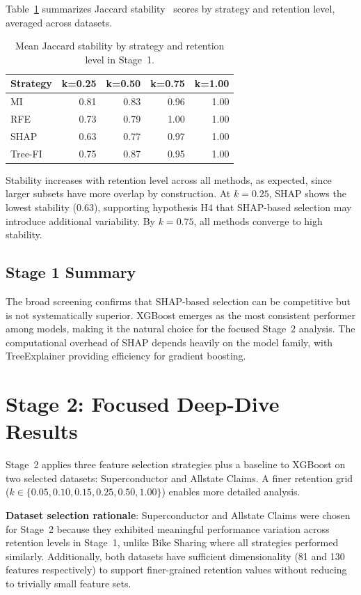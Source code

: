 Table~\ref{tab:stage1_stability} summarizes Jaccard stability~\cite{Nogueira2018Stability} scores by strategy and retention level, averaged across datasets.

\begin{table}[ht!]
\centering
\caption{Mean Jaccard stability by strategy and retention level in Stage~1.}
\label{tab:stage1_stability}
\begin{tabular}{lrrrr}
\toprule
\textbf{Strategy} & \textbf{k=0.25} & \textbf{k=0.50} & \textbf{k=0.75} & \textbf{k=1.00} \\
\midrule
MI & 0.81 & 0.83 & 0.96 & 1.00 \\
RFE & 0.73 & 0.79 & 1.00 & 1.00 \\
SHAP & 0.63 & 0.77 & 0.97 & 1.00 \\
Tree-FI & 0.75 & 0.87 & 0.95 & 1.00 \\
\bottomrule
\end{tabular}
\end{table}

Stability increases with retention level across all methods, as expected, since larger subsets have more overlap by construction. At $k=0.25$, SHAP shows the lowest stability (0.63), supporting hypothesis H4 that SHAP-based selection may introduce additional variability. By $k=0.75$, all methods converge to high stability.

\subsection{Stage 1 Summary}

The broad screening confirms that SHAP-based selection can be competitive but is not systematically superior. XGBoost emerges as the most consistent performer among models, making it the natural choice for the focused Stage~2 analysis. The computational overhead of SHAP depends heavily on the model family, with TreeExplainer providing efficiency for gradient boosting.

\section{Stage 2: Focused Deep-Dive Results}

Stage~2 applies three feature selection strategies plus a baseline to XGBoost on two selected datasets: Superconductor and Allstate Claims. A finer retention grid ($k \in \{0.05, 0.10, 0.15, 0.25, 0.50, 1.00\}$) enables more detailed analysis.

\textbf{Dataset selection rationale}: Superconductor and Allstate Claims were chosen for Stage~2 because they exhibited meaningful performance variation across retention levels in Stage~1, unlike Bike Sharing where all strategies performed similarly. Additionally, both datasets have sufficient dimensionality (81 and 130 features respectively) to support finer-grained retention values without reducing to trivially small feature sets.

